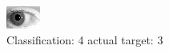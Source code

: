 \begin{figure}[h!]
\begin{center}
\includegraphics[width=0.60\columnwidth]{figures/ID320_class_4_target_3.png}
\end{center}
\caption{ Classification: 4 actual target: 3}
\label{fig:ID320_class_4_target_3}
\end{figure}
